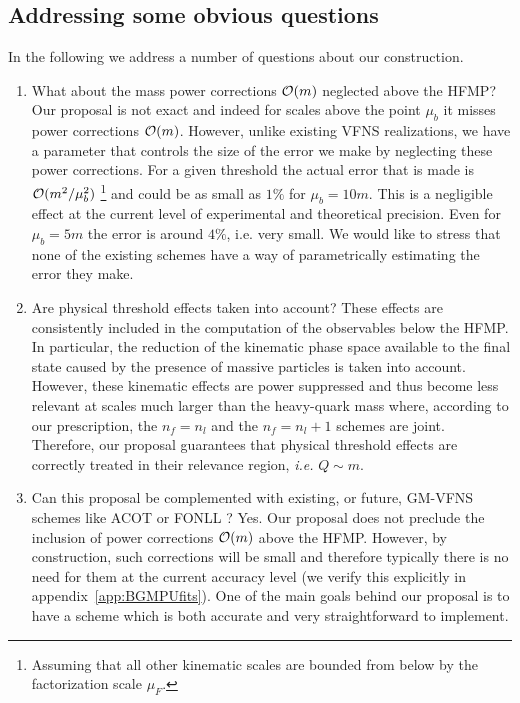 \documentclass[letter,11pt]{article}
\newcommand{\muF}{\mu_F}
\def\mub{\mu_b}
\begin{document}
\subsection{Addressing some obvious questions}



In the following we address a number of questions about our construction.

%
\begin{enumerate}
%
\item What about the mass power corrections ${\cal O}(m)$ neglected above the HFMP? Our proposal is not exact and indeed for scales above the point $\mub$ it misses power corrections ${\cal O}(m)$. However, unlike existing VFNS realizations, we have a parameter that controls the size of the error we make by neglecting these power corrections. For a given threshold the actual error that is made is ${\cal O}(m^2/\mub^2)$ 
%
\footnote{Assuming that all other kinematic scales are bounded from below by the factorization scale $\muF$.}
%
and could be as small as $1\%$ for $\mub=10 m$. This is a negligible effect at the current level of experimental and theoretical precision. Even for $\mub=5 m$ the error is around $4\%$, i.e. very small. We would like to stress that none of the existing schemes have a way of parametrically estimating the error they make.
%

\item {\color{red} Are physical threshold effects taken into account? These effects are consistently included in the computation of the observables below the HFMP. In particular, the reduction of the kinematic phase space available to the final state caused by the presence of massive particles is taken into account. However, these kinematic effects are power suppressed and thus become less relevant at scales much larger than the heavy-quark mass where, according to our prescription, the $n_f = n_l$ and the $n_f = n_l + 1$ schemes are joint. Therefore, our proposal guarantees that physical threshold effects are correctly treated in their relevance region, \textit{i.e.} $Q \sim m$.}
%
\item Can this proposal be complemented with existing, or future, GM-VFNS schemes like ACOT \cite{Aivazis:1993pi} or FONLL \cite{Forte:2010ta}? Yes. Our proposal does not preclude the inclusion of power corrections ${\cal O}(m)$ above the HFMP. However, by construction, such corrections will be small and therefore typically there is no need for them at the current accuracy level (we verify this explicitly in appendix~\ref{app:BGMPUfits}). One of the main goals behind our proposal is to have a scheme which is both accurate and very straightforward to implement.


\end{enumerate}
\end{document}
